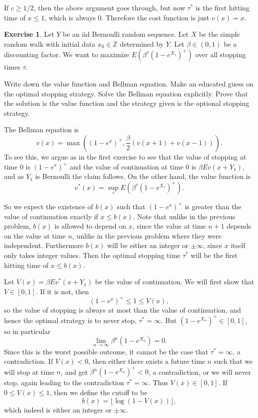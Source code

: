 \documentclass[10pt]{article}
\newcommand{\ZZ}{\mathbb{Z}}
\theoremstyle{definition}
\newtheorem{exer}{Exercise}
\begin{document}
If $c \geq 1/2$, then the above argument goes through, but now $\tau^*$ is the first hitting time of $x \leq 1$, which is always $0$. Therefore the cost function is just $v(x) = x$.



\begin{exer}
Let $Y$ be an iid Bernoulli random sequence. Let $X$ be the simple random walk with initial data $x_0 \in \ZZ$ determined by $Y$.
Let $\beta \in (0, 1)$ be a discounting factor. We want to maximize $E(\beta^\tau(1 - e^{X_\tau})^+)$ over all stopping times $\tau$.

Write down the value function and Bellman equation. Make an educated guess on the optimal stopping strategy. Solve the Bellman equation explicitly. Prove that the solution is the value function and the strategy given is the optional stopping strategy.
\end{exer}

The Bellman equation is
$$v(x) = \max\left((1 - e^x)^+, \frac{\beta}{2}(v(x + 1) + v(x - 1))\right).$$
To see this, we argue as in the first exercise to see that the value of stopping at time $0$ is $(1 - e^x)^+$ and the value of continuation at time $0$ is $\beta Ev(x + Y_1)$, and as $Y_1$ is Bernoulli the claim follows.
On the other hand, the value function is
$$v^*(x) = \sup_\tau E(\beta^\tau(1 - e^{X_\tau})^+).$$

So we expect the existence of $b(x)$ such that $(1 - e^x)^+$ is greater than the value of continuation exactly if $x \leq b(x)$.
Note that unlike in the previous problem, $b(x)$ is allowed to depend on $x$, since the value at time $n + 1$ depends on the value at time $n$, unlike in the previous problem where they were independent.
Furthermore $b(x)$ will be either an integer or $\pm \infty$, since $x$ itself only takes integer values.
Then the optimal stopping time $\tau^*$ will be the first hitting time of $x \leq b(x)$.

Let $V(x) = \beta Ev^*(x + Y_1)$ be the value of continuation.
We will first show that $V \in [0, 1]$.
If it is not, then
$$(1 - e^x)^+ \leq 1 \leq V(x),$$
so the value of stopping is always at most than the value of continuation, and hence the optimal strategy is to never stop, $\tau^* = \infty$.
But $(1 - e^{X_n})^+ \in [0, 1]$, so in particular
$$\lim_{n \to \infty} \beta^n(1 - e^{X_n}) = 0.$$
Since this is the worst possible outcome, it cannot be the case that $\tau^* = \infty$, a contradiction.
If $V(x) < 0$, then either there exists a future time $n$ such that we will stop at time $n$, and get $\beta^n(1 - e^{X_n})^+ < 0$, a contradiction, or we will never stop, again leading to the contradiction $\tau^* = \infty$. Thus $V(x) \in [0, 1]$.
If $0 \leq V(x) \leq 1$, then we define the cutoff to be
$$b(x) = \lfloor \log (1 - V(x)) \rfloor,$$
which indeed is either an integer or $\pm\infty$.
\end{document}
